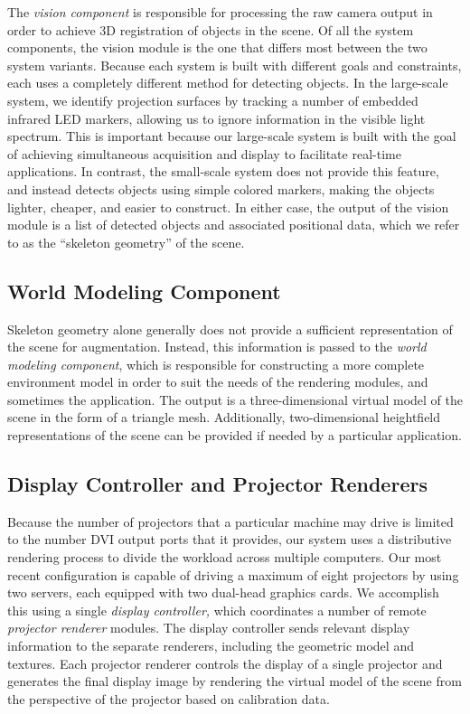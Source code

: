 \documentclass{thesis}
\begin{document}
The \emph{vision component} is responsible for processing the raw camera output in order to achieve 3D registration of objects in the scene. Of all the system components, the vision module is the one that differs most between the two system variants. Because each system is built with different goals and constraints, each uses a completely different method for detecting objects. In the large-scale system, we identify projection surfaces by tracking a number of embedded infrared LED markers, allowing us to ignore information in the visible light spectrum. This is important because our large-scale system is built with the goal of achieving simultaneous acquisition and display to facilitate real-time applications. In contrast, the small-scale system does not provide this feature, and instead detects objects using simple colored markers, making the objects lighter, cheaper, and easier to construct. In either case, the output of the vision module is a list of detected objects and associated positional data, which we refer to as the ``skeleton geometry'' of the scene.

\subsection{World Modeling Component }

Skeleton geometry alone generally does not provide a sufficient representation of the scene for augmentation. Instead, this information is passed to the \emph{world modeling component}, which is responsible for constructing a more complete environment model in order to suit the needs of the rendering modules, and sometimes the application. The output is a three-dimensional virtual model of the scene in the form of a triangle mesh. Additionally, two-dimensional heightfield representations of the scene can be provided if needed by a particular application. 

\subsection{Display Controller and Projector Renderers }

Because the number of projectors that a particular machine may drive is limited to the number DVI output ports that it provides, our system uses a distributive rendering process to divide the workload across multiple computers. Our most recent configuration is capable of driving a maximum of eight projectors by using two servers, each equipped with two dual-head graphics cards. We accomplish this using a single \emph{display controller,} which coordinates a number of remote \emph{projector renderer} modules. The display controller sends relevant display information to the separate renderers, including the geometric model and textures. Each projector renderer controls the display of a single projector and generates the final display image by rendering the virtual model of the scene from the perspective of the projector based on calibration data.
\end{document}
